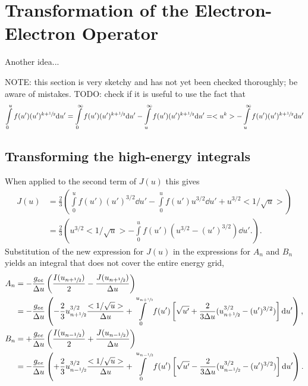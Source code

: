 \documentclass{book}
\newcommand{\frachalf}{\ensuremath{\sfrac{1}{2}}}
\newcommand{\phalf}[1]{\ensuremath{{#1}+\frachalf}}
\newcommand{\mhalf}[1]{\ensuremath{{#1}-\frachalf}}
\begin{document}
\section{Transformation of the Electron-Electron Operator}

Another idea...

NOTE: this section is very sketchy and has not yet been checked thoroughly; be aware of mistakes.
TODO: check if it is useful to use the fact that
\begin{equation}
	\int\limits_0^u f(u')(u')^{k+\frachalf}\dd{u'}
	=
	\int\limits_0^\infty f(u')(u')^{k+\frachalf}\dd{u'}
	-
	\int\limits_u^\infty f(u')(u')^{k+\frachalf}\dd{u'}
	=
	<u^k>
	-
	\int\limits_u^\infty f(u')(u')^{k+\frachalf}\dd{u'}
\end{equation}

\subsection{Transforming the high-energy integrals}
When applied to the second term of $J(u)$ this gives
\begin{align}
	J(u)
	&= \frac{2}{3}\left(
		\int\limits_0^u f(u')(u')^{3/2}\dd{u'}
		-
		\int\limits_0^u f(u')u^{3/2}\dd{u'}
		+
		u^{3/2}<1/\sqrt{u}>
	\right)
	\nonumber \\
	&= \frac{2}{3}\left(
		u^{3/2}<1/\sqrt{u}>
		-
		\int\limits_0^u f(u')(u^{3/2}-(u')^{3/2})\dd{u'}.
	\right).
\end{align}
Substitution of the new expression for $J(u)$ in the expressions for $A_n$
and $B_n$ yields an integral that does not cover the entire energy grid,
\begin{align}
	A_n &= -\frac{g_{ee}}{\Delta u}\left(\frac{I(u_{\phalf{n}})}{2} - \frac{J(u_{\phalf{n}})}{\Delta u}\right)
		\nonumber \\
	&= -\frac{g_{ee}}{\Delta u}\left(
		-\frac{2}{3}u_{\phalf{n}}^{3/2}\frac{<1/\sqrt{u}>}{\Delta u} + \int\limits_0^{u_{\phalf{n}}} f(u')\left[\sqrt{u'} + \frac{2}{3\Delta u}(u_{\phalf{n}}^{3/2}-(u')^{3/2})\right]\dd{u'}
		\right),
		\\
	B_n &= +\frac{g_{ee}}{\Delta u}\left(\frac{I(u_{\mhalf{n}})}{2} + \frac{J(u_{\mhalf{n}})}{\Delta u}\right)
		\nonumber \\
	&= -\frac{g_{ee}}{\Delta u}\left(
		+\frac{2}{3}u_{\mhalf{n}}^{3/2}\frac{<1/\sqrt{u}>}{\Delta u} + \int\limits_0^{u_{\mhalf{n}}} f(u')\left[\sqrt{u'} - \frac{2}{3\Delta u}(u_{\mhalf{n}}^{3/2}-(u')^{3/2})\right]\dd{u'}
		\right).
\end{align}
\end{document}
